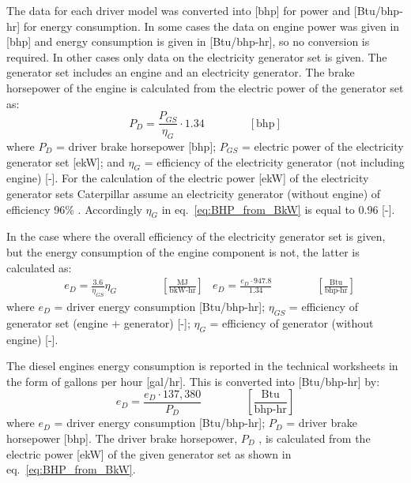 \documentclass[11pt]{report}
\newcommand{\eqnunit}[1]{\quad\quad \scriptstyle{\left[\text{#1}\right]}}
\newcommand{\eqnunitfrac}[2]{\quad\quad \scriptstyle{\left[\frac{\text{#1}}{\text{#2}}\right]}}
\begin{document}
The data for each driver model was converted into [bhp] for power and [Btu/bhp-hr] for energy consumption. In some cases the data on engine power was given in [bhp] and energy consumption is given in [Btu/bhp-hr], so no conversion is required. In other cases only data on the electricity generator set is given. The generator set includes an engine and an electricity generator. The brake horsepower of the engine is calculated from the electric power of the generator set as:
\begin{equation}\label{eq:BHP_from_BkW}
P_{D}= \frac{P_{GS}}{\eta_{G}} \cdot 1.34 \quad\quad\eqnunit{bhp}
\end{equation}
where $P_{D}$ = driver brake horsepower [bhp]; $P_{GS}$ = electric power of the electricity generator set [ekW]; and $\eta_{G}$ = efficiency of the electricity generator (not including engine) [-]. For the calculation of the electric power [ekW] of the electricity generator sets Caterpillar assume an electricity generator (without engine) of efficiency 96\% \cite[p. 4]{Caterpillar2012b}. Accordingly $\eta_{G}$ in eq.\ \eqref{eq:BHP_from_BkW} is equal to 0.96 [-].


In the case where the overall efficiency of the electricity generator set is given, but the energy consumption of the engine component is not, the latter is calculated as:
\begin{equation} \label{eq:calc_EC_eff}
\begin{split}
& e_{D} = \frac{3.6}{\eta_{GS}} \eta_{G} \quad\quad\eqnunitfrac{MJ}{bkW-hr}
& e_{D} = \frac{e_{D} \cdot 947.8}{1.34} \quad\quad\eqnunitfrac{Btu}{bhp-hr}
\end{split}
\end{equation}
where $e_{D}$ = driver energy consumption [Btu/bhp-hr]; $\eta_{GS}$ = efficiency of generator set (engine + generator) [-]; $\eta_{G}$ = efficiency of generator (without engine) [-].

The diesel engines energy consumption is reported in the technical worksheets in the form of gallons per hour [gal/hr]. This is converted into [Btu/bhp-hr] by:
\begin{equation} \label{eq:diesel_engine_EC_unit_conversion}
e_{D} = \frac{e_{D} \cdot137,380 }{P_{D}} \quad\quad\eqnunitfrac{Btu}{bhp-hr}
\end{equation}
where $e_{D}$ = driver energy consumption [Btu/bhp-hr]; $P_{D}$ = driver brake horsepower [bhp]. The driver brake horsepower, $P_{D}$ , is calculated from the electric power [ekW] of the given generator set as shown in eq.\ \eqref{eq:BHP_from_BkW}.
\end{document}
